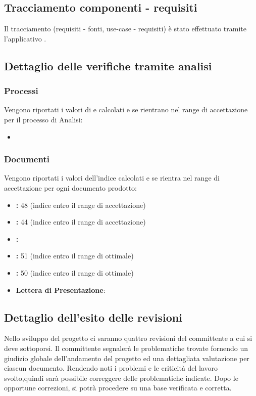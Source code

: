 \documentclass[12pt,a4paper]{article}
\begin{document}
\subsection{Tracciamento componenti - requisiti}
Il tracciamento (requisiti - fonti, use-case - requisiti) è stato effettuato tramite l’applicativo .

\subsection{Dettaglio delle verifiche tramite analisi}
\subsubsection{Processi}
Vengono riportati i valori di  e  calcolati e se rientrano nel range di accettazione per il processo di Analisi:
\begin{itemize}
	\item
\end{itemize}

\subsubsection{Documenti}
Vengono riportati i valori dell'indice  calcolati e se rientra nel range di accettazione per ogni documento prodotto:
\begin{itemize}
	\item \textbf{\NdP{}:} 48 (indice entro il range di accettazione)
	\item \textbf{\SdF{}:} 44 (indice entro il range di accettazione)
	\item \textbf{\AdR{}:} 
	\item \textbf{\PdP{}:} 51 (indice entro il range di ottimale)
	\item \textbf{\PdQ{}:} 50 (indice entro il range di ottimale)
	\item \textbf{Lettera di Presentazione}:
\end{itemize}
\subsection{Dettaglio dell'esito delle revisioni}
Nello sviluppo del progetto ci saranno quattro revisioni del committente a cui si deve sottoporsi. Il committente segnalerà le problematiche trovate fornendo un giudizio globale dell'andamento del progetto ed una dettagliata valutazione per ciascun documento. Rendendo noti i problemi e le criticità del lavoro svolto,quindi sarà possibile correggere delle problematiche indicate. Dopo le opportune correzioni, si potrà procedere su una base verificata e corretta.

\newpage
\printglossary[title={Glossario}]
\end{document}

